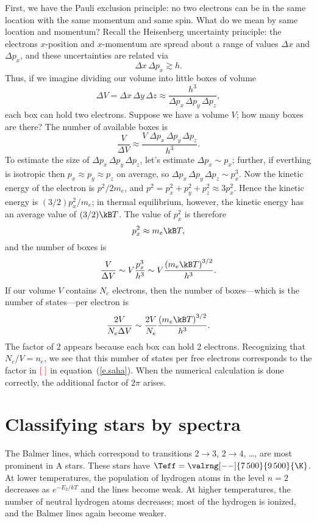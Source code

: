 First, we have the Pauli exclusion principle: no two electrons can be in the same location with the same momentum and same spin. What do we mean by same location and momentum?  Recall the Heisenberg uncertainty principle: the electrons $x$-position and $x$-momentum are spread about a range of values $\Delta x$ and $\Delta p_{x}$, and these uncertainties are related via
\[ \Delta x\,\Delta p_{x} \gtrsim h. \]
Thus, if we imagine dividing our volume into little boxes of volume
\[ 
 \Delta V = \Delta x\,\Delta y\,\Delta z \approx \frac{h^{3}}{\Delta p_{x}\,\Delta p_{y}\,\Delta p_{z}},
\]
each box can hold two electrons. Suppose we have a volume $V$; how many boxes are there?  The number of available boxes is
\[
	\frac{V}{\Delta V} \approx \frac{V\;\Delta p_{x}\,\Delta p_{y}\,\Delta p_{z}}{h^{3}}.
\]
To estimate the size of $\Delta p_{x}\,\Delta p_{y}\,\Delta p_{z}$, let's estimate $\Delta p_{x}\sim p_{x}$; further, if everthing is isotropic then $p_{x}\approx p_{y}\approx p_{z}$ on average, so $\Delta p_{x}\,\Delta p_{y}\,\Delta p_{z} \sim p_{x}^{3}$.  Now the kinetic energy of the electron is $p^{2}/2m_{e}$, and $p^{2} = p_{x}^{2} + p_{y}^{2} + p_{z}^{2} \approx 3 p_{x}^{2}$. Hence the kinetic energy is $(3/2)p_{x}^{2}/m_{e}$; in thermal equilibrium, however, the kinetic energy has an average value of $(3/2)\kB T$.  The value of $p_{x}^{2}$ is therefore
\[
	p_{x}^{2} \approx m_{e}\kB T,
\]
and the number of boxes is
\[
	\frac{V}{\Delta V} \sim V\frac{p_{x}^{3}}{h^{3}} \sim V\frac{\left(m_{e}\kB T\right)^{3/2}}{h^{3}}.
\]
If our volume $V$ contains $N_{e}$ electrons, then the number of boxes---which is the number of states---per electron is
\[
	\frac{2V}{N_{e}\Delta V} \sim \frac{2V}{N_{e}}\frac{\left(m_{e}\kB T\right)^{3/2}}{h^{3}}.
\]
The factor of 2 appears because each box can hold 2 electrons.  Recognizing that $N_{e}/V = n_{e}$, we see that this number of states per free electrons corresponds to the factor in $\color{red}\left[\;\right]$ in equation~(\ref{e.saha}). When the numerical calculation is done correctly, the additional factor of $2\pi$ arises.

\section{Classifying stars by spectra}

The Balmer lines, which correspond to transitions $2\to3$, $2\to 4$, \ldots, are most prominent in A stars. These stars have $\Teff = \valrng[--]{7\,500}{9\,500}{\K}$. At lower temperatures, the population of hydrogen atoms in the level $n=2$ decreases as $e^{-E_{2}/kT}$ and the lines become weak. At higher temperatures, the number of neutral hydrogen atoms decreases; most of the hydrogen is ionized, and the Balmer lines again become weaker.

